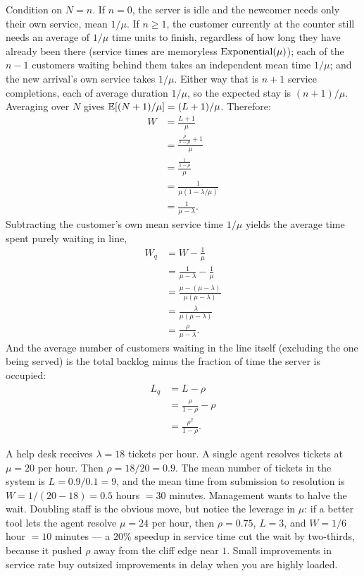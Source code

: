 Condition on $N = n$. If $n = 0$, the server is idle and the newcomer needs only their own
service, mean $1/\mu$. If $n \ge 1$, the customer currently at the counter still needs an
average of $1/\mu$ time units to finish, regardless of how long they have already been there
(service times are memoryless $\operatorname{Exponential}(\mu)$); each of the $n-1$ customers waiting behind them
takes an independent mean time $1/\mu$; and the new arrival's own service takes $1/\mu$. Either
way that is $n + 1$ service completions, each of average duration $1/\mu$, so the expected stay
is $(n+1)/\mu$. Averaging over $N$ gives $\operatorname{\mathbb{E}}[(N+1)/\mu] = (L+1)/\mu$. Therefore:
\begin{align*}
  W &= \frac{L + 1}{\mu} \\
    &= \frac{\frac{\rho}{1-\rho} + 1}{\mu} \\
    &= \frac{\frac{1}{1-\rho}}{\mu} \\
    &= \frac{1}{\mu(1 - \lambda/\mu)} \\
    &= \frac{1}{\mu - \lambda}.
\end{align*}
Subtracting the customer's own mean service time $1/\mu$ yields the average time spent purely waiting
in line,
\begin{align*}
  W_q &= W - \frac{1}{\mu} \\
      &= \frac{1}{\mu - \lambda} - \frac{1}{\mu} \\
      &= \frac{\mu - (\mu - \lambda)}{\mu(\mu - \lambda)} \\
      &= \frac{\lambda}{\mu(\mu - \lambda)} \\
      &= \frac{\rho}{\mu - \lambda}.
\end{align*}
And the average number of customers waiting in the line itself (excluding the one being served) is
the total backlog minus the fraction of time the server is occupied:
\begin{align*}
  L_q &= L - \rho \\
      &= \frac{\rho}{1-\rho} - \rho \\
      &= \frac{\rho^2}{1-\rho}.
\end{align*}

\begin{example}
\label{ch27:ex-helpdesk}
A help desk receives $\lambda = 18$ tickets per hour. A single agent resolves tickets at
$\mu = 20$ per hour. Then $\rho = 18/20 = 0.9$. The mean number of tickets in the system is
$L = 0.9/0.1 = 9$, and the mean time from submission to resolution is
$W = 1/(20 - 18) = 0.5$ hours $= 30$ minutes. Management wants to halve the wait. Doubling staff is
the obvious move, but notice the leverage in $\mu$: if a better tool lets the agent resolve
$\mu = 24$ per hour, then $\rho = 0.75$, $L = 3$, and $W = 1/6$ hour $= 10$ minutes --- a $20\%$
speedup in service time cut the wait by two-thirds, because it pushed $\rho$ away from the cliff edge
near $1$. Small improvements in service rate buy outsized improvements in delay when you are highly
loaded.
\end{example}

